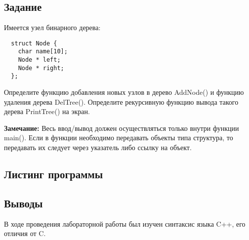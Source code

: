 \documentclass[a4paper,12pt]{article}
\begin{document}
\subsection{Задание}

Имеется узел бинарного дерева:

\begin{lstlisting}
  struct Node {
    char name[10];	
    Node * left;	
    Node * right;	
  };

\end{lstlisting}

Определите функцию добавления новых узлов в дерево AddNode() и функцию удаления дерева DelTree(). Определите рекурсивную функцию вывода такого дерева PrintTree() на экран.

\textbf{Замечание:} Весь ввод/вывод должен осуществляться только внутри функции main(). Если в функции необходимо передавать объекты типа структура, то передавать их следует через указатель либо ссылку на объект.

\subsection{Листинг программы}



\subsection{Выводы}

В ходе проведения лабораторной работы был изучен синтаксис языка C++, его отличия от C.
\end{document}
